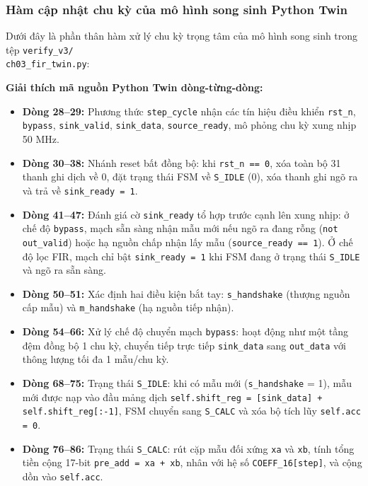 \subsubsection*{Hàm cập nhật chu kỳ của mô hình song sinh Python Twin}
Dưới đây là phần thân hàm xử lý chu kỳ trọng tâm của mô hình song sinh trong tệp \texttt{verify\_v3/}\\ \texttt{ch03\_fir\_twin.py}:



\textbf{Giải thích mã nguồn Python Twin dòng-từng-dòng:}
\begin{itemize}[leftmargin=1.5em, itemsep=2pt]
    \item \textbf{Dòng 28--29:} Phương thức \texttt{step\_cycle} nhận các tín hiệu điều khiển \texttt{rst\_n}, \texttt{bypass}, \texttt{sink\_valid}, \texttt{sink\_data}, \texttt{source\_ready}, mô phỏng chu kỳ xung nhịp 50 MHz.
    \item \textbf{Dòng 30--38:} Nhánh reset bất đồng bộ: khi \texttt{rst\_n == 0}, xóa toàn bộ 31 thanh ghi dịch về 0, đặt trạng thái FSM về \texttt{S\_IDLE} (0), xóa thanh ghi ngõ ra và trả về \texttt{sink\_ready = 1}.
    \item \textbf{Dòng 41--47:} Đánh giá cờ \texttt{sink\_ready} tổ hợp trước cạnh lên xung nhịp: ở chế độ \texttt{bypass}, mạch sẵn sàng nhận mẫu mới nếu ngõ ra đang rỗng (\texttt{not out\_valid}) hoặc hạ nguồn chấp nhận lấy mẫu (\texttt{source\_ready == 1}). Ở chế độ lọc FIR, mạch chỉ bật \texttt{sink\_ready = 1} khi FSM đang ở trạng thái \texttt{S\_IDLE} và ngõ ra sẵn sàng.
    \item \textbf{Dòng 50--51:} Xác định hai điều kiện bắt tay: \texttt{s\_handshake} (thượng nguồn cấp mẫu) và \texttt{m\_handshake} (hạ nguồn tiếp nhận).
    \item \textbf{Dòng 54--66:} Xử lý chế độ chuyển mạch \texttt{bypass}: hoạt động như một tầng đệm đồng bộ 1 chu kỳ, chuyển tiếp trực tiếp \texttt{sink\_data} sang \texttt{out\_data} với thông lượng tối đa 1 mẫu/chu kỳ.
    \item \textbf{Dòng 68--75:} Trạng thái \texttt{S\_IDLE}: khi có mẫu mới (\texttt{s\_handshake} = 1), mẫu mới được nạp vào đầu mảng dịch \texttt{self.shift\_reg = [sink\_data] + self.shift\_reg[:-1]}, FSM chuyển sang \texttt{S\_CALC} và xóa bộ tích lũy \texttt{self.acc = 0}.
    \item \textbf{Dòng 76--86:} Trạng thái \texttt{S\_CALC}: rút cặp mẫu đối xứng \texttt{xa} và \texttt{xb}, tính tổng tiền cộng 17-bit \texttt{pre\_add = xa + xb}, nhân với hệ số \texttt{COEFF\_16[step]}, và cộng dồn vào \texttt{self.acc}.

\end{itemize}
